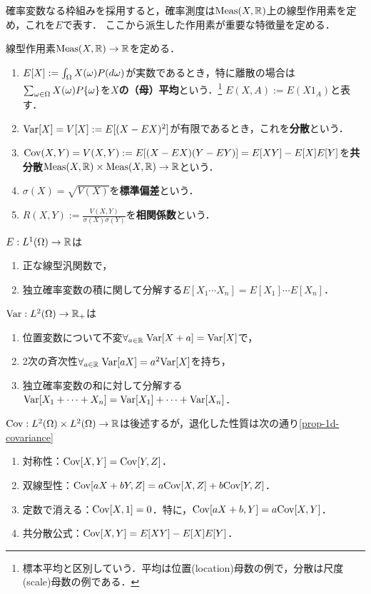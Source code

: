 \documentclass[uplatex,dvipdfmx]{jsreport}
\begin{document}
\begin{tcolorbox}[colframe=ForestGreen, colback=ForestGreen!10!white,breakable,colbacktitle=ForestGreen!40!white,coltitle=black,fonttitle=\bfseries\sffamily,
title=]
    確率変数なる枠組みを採用すると，確率測度は$\mathrm{Meas}(X,\mathbb{R})$上の線型作用素を定め，これを$E$で表す．
    ここから派生した作用素が重要な特徴量を定める．
\end{tcolorbox}

\begin{definition}
    線型作用素$\mathrm{Meas}(X,\mathbb{R})\to\mathbb{R}$を定める．
    \begin{enumerate}
        \item $E[X]:=\int_\Omega X(\omega)P(d\omega)$が実数であるとき，特に離散の場合は$\sum_{\omega\in\Omega}X(\omega)P\{\omega\}$を\textbf{$X$の（母）平均}という．\footnote{標本平均と区別していう．平均は位置(location)母数の例で，分散は尺度(scale)母数の例である．}
            $E(X,A):=E(X1_A)$と表す．
        \item $\mathrm{Var}[X]=V[X]:=E[(X-EX)^2]$が有限であるとき，これを\textbf{分散}という．
        \item $\mathrm{Cov}(X,Y)=V(X,Y):=E[(X-EX)(Y-EY)]=E[XY]-E[X]E[Y]$を\textbf{共分散}$\mathrm{Meas}(X,\mathbb{R})\times\mathrm{Meas}(X,\mathbb{R})\to\mathbb{R}$という．
        \item $\sigma(X)=\sqrt{V(X)}$を\textbf{標準偏差}という．
        \item $R(X,Y):=\frac{V(X,Y)}{\sigma(X)\sigma(Y)}$を\textbf{相関係数}という．
    \end{enumerate}
\end{definition}

$E:L^1(\Omega)\to\mathbb{R}$は
\begin{enumerate}
    \item 正な線型汎関数で，
    \item 独立確率変数の積に関して分解する$E[X_1\cdots X_n]=E[X_1]\cdots E[X_n]$．
\end{enumerate}

$\mathrm{Var}:L^2(\Omega)\to\mathbb{R}_+$は
\begin{enumerate}
    \item 位置変数について不変$\forall_{a\in\mathbb{R}}\;\mathrm{Var}[X+a]=\mathrm{Var}[X]$で，
    \item 2次の斉次性$\forall_{a\in\mathbb{R}}\;\mathrm{Var}[aX]=a^2\mathrm{Var}[X]$を持ち，
    \item 独立確率変数の和に対して分解する$\mathrm{Var}[X_1+\cdots+X_n]=\mathrm{Var}[X_1]+\cdots+\mathrm{Var}[X_n]$．
\end{enumerate}

$\mathrm{Cov}:L^2(\Omega)\times L^2(\Omega)\to\mathbb{R}$は後述するが，退化した性質は次の通り\ref{prop-1d-covariance}
\begin{enumerate}
    \item 対称性：$\mathrm{Cov}[X,Y]=\mathrm{Cov}[Y,Z]$．
    \item 双線型性：$\mathrm{Cov}[aX+bY,Z]=a\mathrm{Cov}[X,Z]+b\mathrm{Cov}[Y,Z]$．
    \item 定数で消える：$\mathrm{Cov}[X,1]=0$．特に，$\mathrm{Cov}[aX+b,Y]=a\mathrm{Cov}[X,Y]$．
    \item 共分散公式：$\mathrm{Cov}[X,Y]=E[XY]-E[X]E[Y]$．
\end{enumerate}
\end{document}
